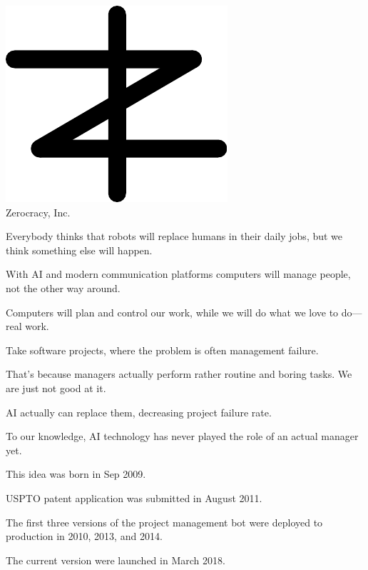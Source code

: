 \documentclass{article}
\begin{document}

\newcommand\slide[1]{%
  \pagebreak\topskip0pt\vspace*{\fill}%
  \begin{center}\Huge%
  #1
  \end{center}%
  \vspace*{\fill}%
}

\slide{\includegraphics[scale=1]{../images/zerocracy-logo.pdf}\\
Zerocracy, Inc.}

\slide{Everybody thinks that robots will replace humans in their daily jobs, but we think something else will happen.}

\slide{With AI and modern communication platforms computers will manage people, not the other way around.}

\slide{Computers will plan and control our work, while we will do what we love to do---real work.}

\slide{Take software projects, where the problem is often management failure.}

\slide{That’s because managers actually perform rather routine and boring tasks. We are just not good at it.}

\slide{AI actually can replace them, decreasing project failure rate.}

\slide{To our knowledge, AI technology has never played the role of an actual manager yet.}

\slide{This idea was born in Sep 2009.}

\slide{USPTO patent application was submitted in August 2011.\quad{\large US 12/703,202}}

\slide{The first three versions of the project management bot were deployed to production in 2010, 2013, and 2014.}

\slide{The current version were launched in March 2018.}
\end{document}
